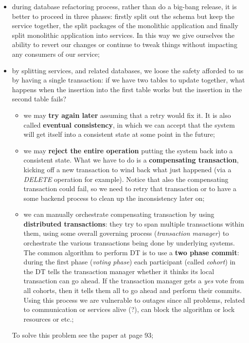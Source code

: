 \documentclass[oneside]{article}
\begin{document}
\begin{itemize}
    \item during database refactoring process, rather than do a big-bang release, it is better to proceed in three phases: firstly split out the schema but keep the service together, the split packages of the monolithic application and finally split monolithic application into services. In this way we give ourselves the ability to revert our changes or continue to tweak things without impacting any consumers of our service;
    
    \item by splitting services, and related databases, we loose the safety afforded to us by having a single transaction: if we have two tables to update together, what happens when the insertion into the first table works but the insertion in the second table fails?
        \begin{itemize}
            \item we may \textbf{try again later} assuming that a retry would fix it. It is also called \textbf{eventual consistency}, in which we can accept that the system will get itself into a consistent state at some point in the future;
            \item we may \textbf{reject the entire operation} putting the system back into a consistent state. What we have to do is a \textbf{compensating transaction}, kicking off a new transaction to wind back what just happened (via a \textit{DELETE} operation for example). Notice that also the compensating transaction could fail, so we need to retry that transaction or to have a some backend process to clean up the inconsistency later on;
            \item we can manually orchestrate compensating transaction by using \textbf{distributed transactions}: they try to span multiple transactions within them, using some overall governing process (\textit{transaction manager}) to orchestrate the various transactions being done by underlying systems. The common algorithm to perform DT is to use a \textbf{two phase commit}: during the first phase (\textit{voting phase}) each participant (called \textit{cohort}) in the DT tells the transaction manager whether it thinks its local transaction can go ahead. If the transaction manager gets a \textit{yes} vote from all cohorts, then it tells them all to go ahead and perform their commits. Using this process we are vulnerable to outages since all problems, related to communication or services alive (?), can block the algorithm or lock resources or etc.;
        \end{itemize}
    To solve this problem see the paper at page 93;
    

\end{itemize}
\end{document}

